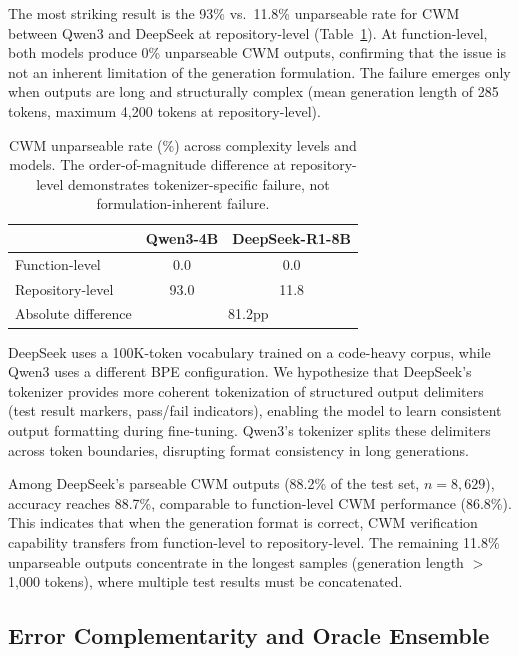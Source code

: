 \documentclass[11pt,a4paper]{article}
\begin{document}
The most striking result is the 93\% vs.\ 11.8\% unparseable rate for CWM between Qwen3 and DeepSeek at repository-level (Table~\ref{tab:unparseable}).
At function-level, both models produce 0\% unparseable CWM outputs, confirming that the issue is not an inherent limitation of the generation formulation.
The failure emerges only when outputs are long and structurally complex (mean generation length of 285 tokens, maximum 4,200 tokens at repository-level).

\begin{table}[t]
\centering
\small
\caption{CWM unparseable rate (\%) across complexity levels and models. The order-of-magnitude difference at repository-level demonstrates tokenizer-specific failure, not formulation-inherent failure.}
\label{tab:unparseable}
\begin{tabular}{lcc}
\toprule
& \textbf{Qwen3-4B} & \textbf{DeepSeek-R1-8B} \\
\midrule
Function-level & 0.0 & 0.0 \\
Repository-level & 93.0 & 11.8 \\
\midrule
Absolute difference & \multicolumn{2}{c}{81.2pp} \\
\bottomrule
\end{tabular}
\end{table}

DeepSeek uses a 100K-token vocabulary trained on a code-heavy corpus, while Qwen3 uses a different BPE configuration.
We hypothesize that DeepSeek's tokenizer provides more coherent tokenization of structured output delimiters (test result markers, pass/fail indicators), enabling the model to learn consistent output formatting during fine-tuning.
Qwen3's tokenizer splits these delimiters across token boundaries, disrupting format consistency in long generations.

Among DeepSeek's parseable CWM outputs (88.2\% of the test set, $n{=}8{,}629$), accuracy reaches 88.7\%, comparable to function-level CWM performance (86.8\%).
This indicates that when the generation format is correct, CWM verification capability transfers from function-level to repository-level.
The remaining 11.8\% unparseable outputs concentrate in the longest samples (generation length $>$ 1,000 tokens), where multiple test results must be concatenated.

\subsection{Error Complementarity and Oracle Ensemble}
\label{sec:ensemble}
\end{document}
